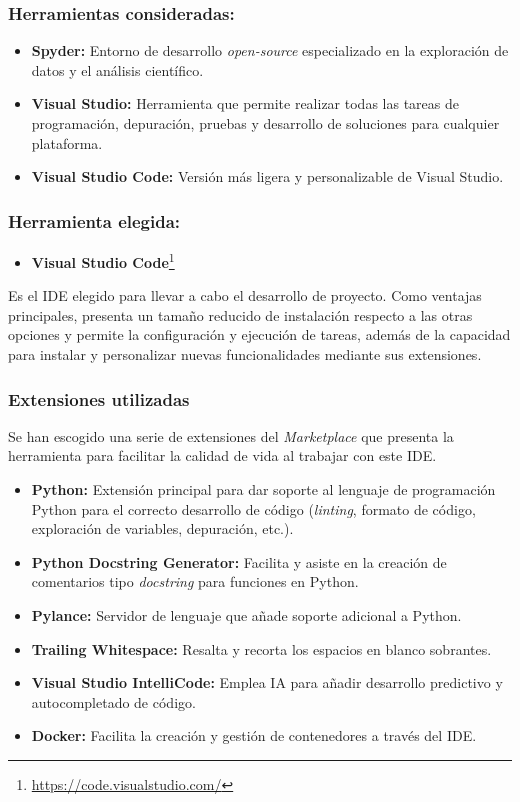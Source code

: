 \subsubsection{Herramientas consideradas:}

\begin{itemize}
    \item \textbf{Spyder:} Entorno de desarrollo \textit{open-source} especializado en la exploración de datos y el análisis científico.
    \item \textbf{Visual Studio:} Herramienta que permite realizar todas las tareas de programación, depuración, pruebas y desarrollo de soluciones para cualquier plataforma.
    \item \textbf{Visual Studio Code:} Versión más ligera y personalizable de Visual Studio.
\end{itemize}

\subsubsection{Herramienta elegida:}

\begin{itemize}
    \item \textbf{Visual Studio Code}\footnote{\url{https://code.visualstudio.com/}}
\end{itemize}

Es el IDE elegido para llevar a cabo el desarrollo de proyecto. Como ventajas principales, presenta un tamaño reducido de instalación respecto a las otras opciones y permite la configuración y ejecución de tareas, además de la capacidad para instalar y personalizar nuevas funcionalidades mediante sus extensiones.

\subsubsection{Extensiones utilizadas}

Se han escogido una serie de extensiones del \textit{Marketplace} que presenta la herramienta para facilitar la calidad de vida al trabajar con este IDE.

\begin{itemize}
    \item \textbf{Python:} Extensión principal para dar soporte al lenguaje de programación Python para el correcto desarrollo de código (\textit{linting}, formato de código, exploración de variables, depuración, etc.).
    \item \textbf{Python Docstring Generator:} Facilita y asiste en la creación de comentarios tipo \textit{docstring} para funciones en Python.
    \item \textbf{Pylance:} Servidor de lenguaje que añade soporte adicional a Python.
    \item \textbf{Trailing Whitespace:} Resalta y recorta los espacios en blanco sobrantes.
    \item \textbf{Visual Studio IntelliCode:} Emplea IA para añadir desarrollo predictivo y autocompletado de código.
    \item \textbf{Docker:} Facilita la creación y gestión de contenedores a través del IDE.
\end{itemize}

